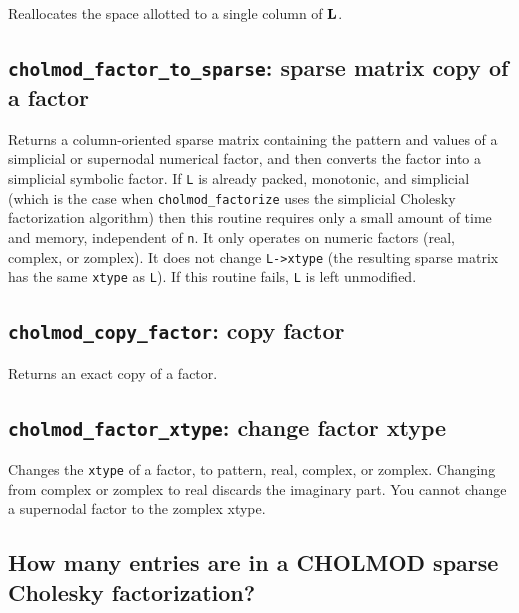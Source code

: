 \documentclass[11pt]{article}
\newcommand{\m}[1]{{\bf{#1}}}       %
\begin{document}

Reallocates the space allotted to a single column of $\m{L}$.

\subsection{{\tt cholmod\_factor\_to\_sparse}: sparse matrix copy of a factor}


Returns a column-oriented sparse matrix containing the pattern and values of a
simplicial or supernodal numerical factor, and then converts the factor into a
simplicial symbolic factor.  If {\tt L} is already packed, monotonic, and
simplicial (which is the case when {\tt cholmod\_factorize} uses the simplicial
Cholesky factorization algorithm) then this routine requires only a small
amount of time and memory, independent of {\tt n}.  It only operates on numeric
factors (real, complex, or zomplex).  It does not change {\tt L->xtype} (the
resulting sparse matrix has the same {\tt xtype} as {\tt L}).  If this routine
fails, {\tt L} is left unmodified.

\subsection{{\tt cholmod\_copy\_factor}: copy factor}


Returns an exact copy of a factor.

\subsection{{\tt cholmod\_factor\_xtype}: change factor xtype}


Changes the {\tt xtype} of a factor, to pattern, real, complex, or zomplex.
Changing from complex or zomplex to real discards the imaginary part.
You cannot change a supernodal factor to the zomplex xtype.
 
\subsection{How many entries are in a CHOLMOD sparse Cholesky factorization?}
\end{document}
